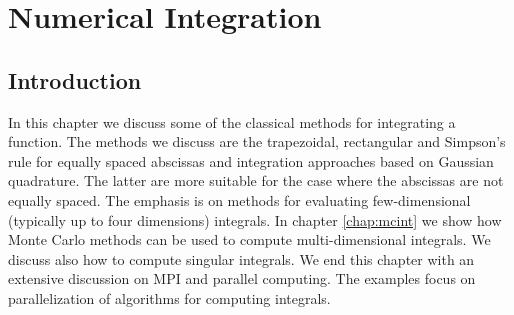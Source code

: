 \chapter{Numerical Integration} \label{chap:integrate}

\section{Introduction}
In this chapter
we discuss some of the classical methods for integrating a function. The methods we discuss are  the trapezoidal, rectangular and Simpson's rule for equally spaced 
abscissas  and integration approaches  
based on Gaussian quadrature. The latter are more suitable
for the case where the abscissas are not equally spaced. 
The emphasis is on 
methods for evaluating few-dimensional (typically up to four dimensions) integrals. In
chapter \ref{chap:mcint} 
we show how Monte Carlo methods can be used to compute multi-dimensional
integrals.
We discuss also how to compute 
singular integrals.
We end this chapter with an extensive discussion on MPI and parallel computing.
The examples focus on parallelization of algorithms for computing integrals. 

